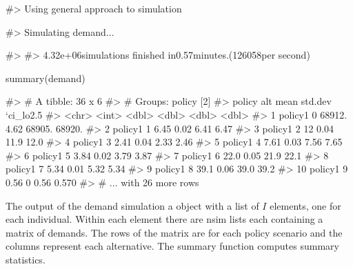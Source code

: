 \begin{Schunk}
\begin{Soutput}
#> Using general approach to simulation
\end{Soutput}
\begin{Soutput}
#> Simulating demand...
\end{Soutput}
\begin{Soutput}
#> 
#> 4.32e+06simulations finished in0.57minutes.(126058per second)
\end{Soutput}
\begin{Sinput}
summary(demand)
\end{Sinput}
\begin{Soutput}
#> # A tibble: 36 x 6
#> # Groups:   policy [2]
#>    policy    alt     mean std.dev `ci_lo2.5%` `ci_hi97.5%`
#>    <chr>   <int>    <dbl>   <dbl>       <dbl>        <dbl>
#>  1 policy1     0 68912.      4.62    68905.      68920.   
#>  2 policy1     1     6.45    0.02        6.41        6.47 
#>  3 policy1     2    12       0.04       11.9        12.0  
#>  4 policy1     3     2.41    0.04        2.33        2.46 
#>  5 policy1     4     7.61    0.03        7.56        7.65 
#>  6 policy1     5     3.84    0.02        3.79        3.87 
#>  7 policy1     6    22.0     0.05       21.9        22.1  
#>  8 policy1     7     5.34    0.01        5.32        5.34 
#>  9 policy1     8    39.1     0.06       39.0        39.2  
#> 10 policy1     9     0.56    0           0.56        0.570
#> # ... with 26 more rows
\end{Soutput}
\end{Schunk}

The output of the demand simulation a  object with a
list of \(I\) elements, one for each individual. Within each element
there are nsim lists each containing a matrix of demands. The rows of
the matrix are for each policy scenario and the columns represent each
alternative. The summary function computes summary statistics.


